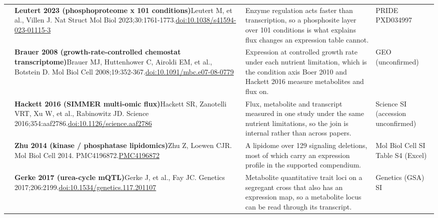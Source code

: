 \begin{landscape}
\begin{longtable}{@{}r@{\hspace{4pt}} L{86mm} L{92mm} L{62mm}@{}}
 & \textbf{Leutert 2023 (phosphoproteome x 101 conditions)}\newline Leutert M, et al., Villen J. Nat Struct Mol Biol 2023;30:1761-1773.\newline \href{https://doi.org/10.1038/s41594-023-01115-3}{doi:10.1038/\allowbreak s41594-023-01115-3} & Enzyme regulation acts faster than transcription, so a phosphosite layer over 101 conditions is what explains flux changes an expression table cannot. & PRIDE PXD034997 \\
 & \textbf{Brauer 2008 (growth-rate-controlled chemostat transcriptome)}\newline Brauer MJ, Huttenhower C, Airoldi EM, et al., Botstein D. Mol Biol Cell 2008;19:352-367.\newline \href{https://doi.org/10.1091/mbc.e07-08-0779}{doi:10.1091/\allowbreak mbc.e07-08-0779} & Expression at controlled growth rate under each nutrient limitation, which is the condition axis Boer 2010 and Hackett 2016 measure metabolites and flux on. & GEO (unconfirmed) \\
 & \textbf{Hackett 2016 (SIMMER multi-omic flux)}\newline Hackett SR, Zanotelli VRT, Xu W, et al., Rabinowitz JD. Science 2016;354:aaf2786.\newline \href{https://doi.org/10.1126/science.aaf2786}{doi:10.1126/\allowbreak science.aaf2786} & Flux, metabolite and transcript measured in one study under the same nutrient limitations, so the join is internal rather than across papers. & Science SI (accession unconfirmed) \\
 & \textbf{Zhu 2014 (kinase / phosphatase lipidomics)}\newline Zhu Z, Loewen CJR. Mol Biol Cell 2014. PMC4196872.\newline \href{https://pmc.ncbi.nlm.nih.gov/articles/PMC4196872/}{PMC4196872} & A lipidome over 129 signaling deletions, most of which carry an expression profile in the supported compendium. & Mol Biol Cell SI Table S4 (Excel) \\
 & \textbf{Gerke 2017 (urea-cycle mQTL)}\newline Gerke J, et al., Fay JC. Genetics 2017;206:2199.\newline \href{https://doi.org/10.1534/genetics.117.201107}{doi:10.1534/\allowbreak genetics.117.201107} & Metabolite quantitative trait loci on a segregant cross that also has an expression map, so a metabolite locus can be read through its transcript. & Genetics (GSA) SI \\

\end{longtable}
\end{landscape}
